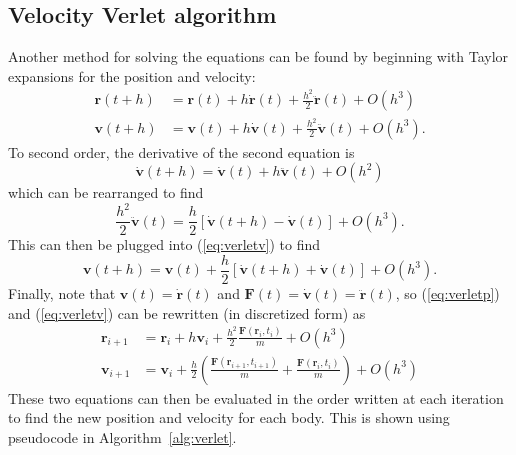 \documentclass[aps,prc,reprint]{revtex4-1}
\begin{document}
    \subsection{Velocity Verlet algorithm}
    \label{sub:verlet}

        Another method for solving the equations can be found by beginning with Taylor expansions for the position and velocity: \cite{Hjorth-Jensen2016}
        \begin{align}
            \mathbf{r}(t+h) &= \mathbf{r}(t) + h \dot{\mathbf{r}}(t) + \frac{h^2}{2}\ddot{\mathbf{r}}(t) + O(h^3) \label{eq:verletp}\\
            \mathbf{v}(t+h) &= \mathbf{v}(t) + h \dot{\mathbf{v}}(t) + \frac{h^2}{2}\ddot{\mathbf{v}}(t) + O(h^3). \label{eq:verletv}
        \end{align}
        To second order, the derivative of the second equation is
        \begin{equation*}
            \dot{\mathbf{v}}(t+h) = \dot{\mathbf{v}}(t) + h \ddot{\mathbf{v}}(t) + O(h^2)
        \end{equation*}
        which can be rearranged to find
        \begin{equation*}
            \frac{h^2}{2}\ddot{\mathbf{v}}(t) = \frac{h}{2} [\dot{\mathbf{v}}(t+h) - \dot{\mathbf{v}}(t)] + O(h^3).
        \end{equation*}
        This can then be plugged into (\ref{eq:verletv}) to find
        \begin{equation*}
            \mathbf{v}(t+h) = \mathbf{v}(t) + \frac{h}{2} [\dot{\mathbf{v}}(t+h) + \dot{\mathbf{v}}(t)] + O(h^3).
        \end{equation*}
        Finally, note that $\mathbf{v}(t) = \dot{\mathbf{r}}(t)$ and $\mathbf{F}(t) = \dot{\mathbf{v}}(t) = \ddot{\mathbf{r}}(t)$, so (\ref{eq:verletp}) and (\ref{eq:verletv}) can be rewritten (in discretized form) as
        \begin{align}
            \mathbf{r}_{i+1} &= \mathbf{r}_i + h\mathbf{v}_i + \frac{h^2}{2} \frac{\mathbf{F}(\mathbf{r}_i, t_i)}{m} + O(h^3) \\
            \mathbf{v}_{i+1} &= \mathbf{v}_i + \frac{h}{2} \left(\frac{\mathbf{F}(\mathbf{r}_{i+1}, t_{i+1})}{m} + \frac{\mathbf{F}(\mathbf{r}_i, t_i)}{m}\right) + O(h^3)
        \end{align}
        These two equations can then be evaluated in the order written at each iteration to find the new position and velocity for each body. \cite{Hjorth-Jensen2016} This is shown using pseudocode in Algorithm~\ref{alg:verlet}.
\end{document}
